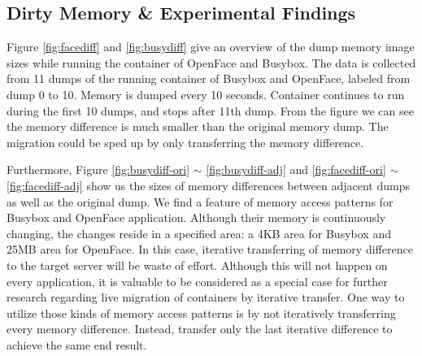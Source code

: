 



\subsection{Dirty Memory \& Experimental Findings}





Figure \ref{fig:facediff}
and  \ref{fig:busydiff} 
give an overview of the dump memory image sizes while running the container of OpenFace and Busybox. 
The data is collected from 11 dumps of the running container of Busybox and OpenFace, labeled from dump 0 to 10. Memory is dumped every 10 seconds. Container continues to run during the first 10 dumps, and stops after 11th dump. From the figure we can see the memory difference is much smaller than the original memory dump. The migration could be sped up by only  transferring the memory difference. 

Furthermore, 
Figure  
\ref{fig:busydiff-ori} $\sim$
\ref{fig:busydiff-adj}  
and 
\ref{fig:facediff-ori} $\sim$
\ref{fig:facediff-adj} 
show us the sizes of memory differences between adjacent dumps as well as the original dump. We find a feature of memory access patterns for Busybox and OpenFace application. Although their memory is continuously changing, the changes reside in a specified area: a 4KB area for Busybox and 25MB area for OpenFace. 
In this case, iterative transferring of memory difference to the target server will be waste of effort. Although this will not happen on every application, it is valuable to be considered as a special case for further research regarding live migration of containers by iterative transfer. One way to utilize those kinds of memory access patterns is by not iteratively transferring every memory difference. Instead, transfer only the last iterative difference to achieve the same end result.


